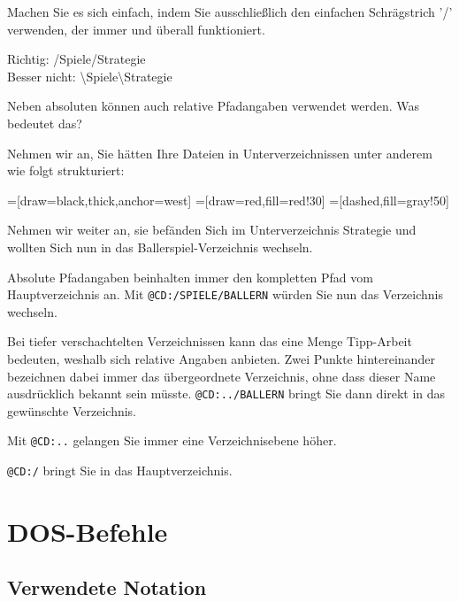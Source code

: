\documentclass[10pt,a4paper]{scrartcl}		%
\begin{document}
Machen Sie es sich einfach, indem Sie ausschließlich
den einfachen Schrägstrich '/' verwenden, der immer und 
überall funktioniert.

Richtig: /Spiele/Strategie\\
Besser nicht: \textbackslash Spiele\textbackslash Strategie

Neben absoluten können auch relative Pfadangaben verwendet werden.
Was bedeutet das?

Nehmen wir an, Sie hätten Ihre Dateien 
in Unterverzeichnissen unter anderem wie folgt strukturiert:

=[draw=black,thick,anchor=west]
=[draw=red,fill=red!30]
=[dashed,fill=gray!50]

Nehmen wir weiter an, sie befänden Sich im Unterverzeichnis Strategie
und wollten Sich nun in das Ballerspiel-Verzeichnis wechseln.

Absolute Pfadangaben beinhalten immer den kompletten Pfad vom
Hauptverzeichnis an. Mit \texttt{@CD:/SPIELE/BALLERN} würden Sie nun
das Verzeichnis wechseln.

Bei tiefer verschachtelten Verzeichnissen kann das eine Menge Tipp-Arbeit
bedeuten, weshalb sich relative Angaben anbieten. Zwei Punkte hintereinander
bezeichnen dabei immer das übergeordnete Verzeichnis, ohne dass
dieser Name ausdrücklich bekannt sein müsste. \texttt{@CD:../BALLERN}
bringt Sie dann direkt in das gewünschte Verzeichnis.

Mit \texttt{@CD:..} gelangen Sie immer eine Verzeichnisebene höher.

\texttt{@CD:/} bringt Sie in das Hauptverzeichnis.

\clearpage
\section{DOS-Befehle}
\subsection{Verwendete Notation}
\end{document}
